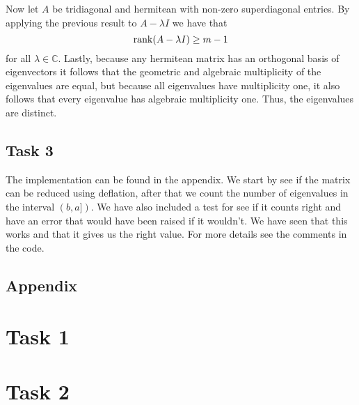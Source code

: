 \documentclass[a4paper,12pt]{article}
\begin{document}
Now let \(A\) be tridiagonal and hermitean with non-zero superdiagonal entries.
By applying the previous result to \(A - \lambda I\) we have that
\[ \mathrm{rank}(A - \lambda I) \ge m-1 \]
for all \(\lambda \in \mathbb{C}\).
Lastly, because any hermitean matrix has an orthogonal basis of eigenvectors it
follows that the geometric and algebraic multiplicity of the eigenvalues are
equal, but because all eigenvalues have multiplicity one, it also follows that
every eigenvalue has algebraic multiplicity one.
Thus, the eigenvalues are distinct.


\begin{comment}
The function \(f\) is linear, as is now shown with induction.
It shall be shown that
\begin{equation}\label{eq:f-linear-kth-component}
  (f(sx_1 + ty_1))_k = (sf(x_1) + tf(y_1))_k
\end{equation}
for all \(s, t, x_1, y_1 \in \mathbb{C}\) and \(1 \le k \le m\).
From this it then follows that
\[ f(sx_1 + ty_1) = sf(x_1) + tf(y_1) \]
i.e. that \(f\) is linear.
Firstly,
\[ (f(sx_1 + ty_1))_1 = sx_1 + ty_1 = (sf(x_1) + tf(y_1))_1. \]
Secondly,
\begin{align*}
  (f(sx_1 + ty_1))_2
    &= -\frac{a_1(sx_1 + ty_1)}{b_2} \\
    &= s\left(-\frac{a_1x_1}{b_2}\right) + t\left(-\frac{a_1y_1}{b_2}\right) \\
    &= (sf(x_1) + tf(y_1))_2
\end{align*}
Suppose that \eqref{eq:f-linear-kth-component} holds for \(k=l-2\) and
\(k=l-1\).
Then one has
\end{comment}


\subsection*{Task 3}
The implementation can be found in the appendix. We start by see if 
the matrix can be reduced using deflation, after that we count the 
number of eigenvalues in the interval \( (b,a] )\). We have also 
included a test for see if it counts right and have an error that 
would have been raised if it wouldn’t. We have seen that this works 
and that it gives us the right value. For more details see the 
comments in the code.  

\clearpage

\appendix
\subsection*{Appendix}
\section{Task 1}

\section{Task 2}

\end{document}
